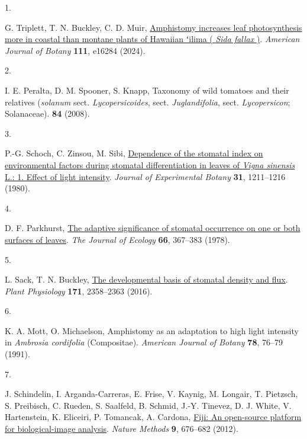 \documentclass[
  letterpaper,
  DIV=11,
  numbers=noendperiod]{scrartcl}
\newlength{\cslhangindent}
\newlength{\csllabelwidth}
\newenvironment{CSLReferences}[2] %
 {\begin{list}{}{%
  \setlength{\itemindent}{0pt}
  \setlength{\leftmargin}{0pt}
  \setlength{\parsep}{0pt}
  \ifodd #1
   \setlength{\leftmargin}{\cslhangindent}
   \setlength{\itemindent}{-1\cslhangindent}
  \fi
  \setlength{\itemsep}{#2\baselineskip}}}
 {\end{list}}
\newcommand{\CSLLeftMargin}[1]{\parbox[t]{\csllabelwidth}{\strut#1\strut}}
\newcommand{\CSLRightInline}[1]{\parbox[t]{\linewidth - \csllabelwidth}{\strut#1\strut}}
\begin{document}
\label{refs}
\begin{CSLReferences}{0}{1}
\CSLLeftMargin{1. }%
\CSLRightInline{G. Triplett, T. N. Buckley, C. D. Muir,
\href{https://doi.org/10.1002/ajb2.16284}{Amphistomy increases leaf
photosynthesis more in coastal than montane plants of {Hawaiian} ʻilima
( \emph{{Sida} fallax} )}. \emph{American Journal of Botany}
\textbf{111}, e16284 (2024).}

\CSLLeftMargin{2. }%
\CSLRightInline{I. E. Peralta, D. M. Spooner, S. Knapp, Taxonomy of wild
tomatoes and their relatives (\emph{solanum} sect.
\emph{Lycopersicoides}, sect. \emph{Juglandifolia}, sect.
\emph{Lycopersicon}; {Solanaceae}). \textbf{84} (2008).}

\CSLLeftMargin{3. }%
\CSLRightInline{P.-G. Schoch, C. Zinsou, M. Sibi,
\href{https://doi.org/10.1093/jxb/31.5.1211}{Dependence of the stomatal
index on environmental factors during stomatal differentiation in leaves
of \emph{{Vigna} sinensis} {L}.: 1. {Effect} of light intensity}.
\emph{Journal of Experimental Botany} \textbf{31}, 1211--1216 (1980).}

\CSLLeftMargin{4. }%
\CSLRightInline{D. F. Parkhurst,
\href{https://doi.org/10.2307/2259142}{The adaptive significance of
stomatal occurrence on one or both surfaces of leaves}. \emph{The
Journal of Ecology} \textbf{66}, 367--383 (1978).}

\CSLLeftMargin{5. }%
\CSLRightInline{L. Sack, T. N. Buckley,
\href{https://doi.org/10.1104/pp.16.00476}{The developmental basis of
stomatal density and flux}. \emph{Plant Physiology} \textbf{171},
2358--2363 (2016).}

\CSLLeftMargin{6. }%
\CSLRightInline{K. A. Mott, O. Michaelson, Amphistomy as an adaptation
to high light intensity in \emph{{Ambrosia} cordifolia} ({Compositae}).
\emph{American Journal of Botany} \textbf{78}, 76--79 (1991).}

\CSLLeftMargin{7. }%
\CSLRightInline{J. Schindelin, I. Arganda-Carreras, E. Frise, V. Kaynig,
M. Longair, T. Pietzsch, S. Preibisch, C. Rueden, S. Saalfeld, B.
Schmid, J.-Y. Tinevez, D. J. White, V. Hartenstein, K. Eliceiri, P.
Tomancak, A. Cardona, \href{https://doi.org/10.1038/nmeth.2019}{Fiji: An
open-source platform for biological-image analysis}. \emph{Nature
Methods} \textbf{9}, 676--682 (2012).}


\end{CSLReferences}
\end{document}
